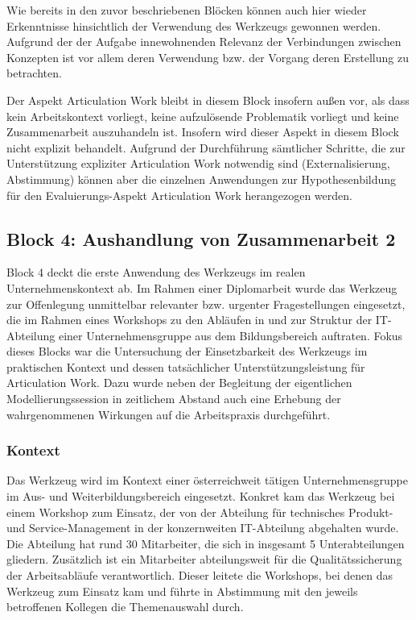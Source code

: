 Wie bereits in den zuvor beschriebenen Blöcken können auch hier wieder Erkenntnisse hinsichtlich der Verwendung des Werkzeugs gewonnen werden. Aufgrund der der Aufgabe innewohnenden Relevanz der Verbindungen zwischen Konzepten ist vor allem deren Verwendung bzw. der Vorgang deren Erstellung zu betrachten.

Der Aspekt Articulation Work bleibt in diesem Block insofern außen vor, als dass kein Arbeitskontext vorliegt, keine aufzulösende Problematik vorliegt und keine Zusammenarbeit auszuhandeln ist. Insofern wird dieser Aspekt in diesem Block nicht explizit behandelt. Aufgrund der Durchführung sämtlicher Schritte, die zur Unterstützung expliziter Articulation Work notwendig sind (Externalisierung, Abstimmung) können aber die einzelnen Anwendungen zur Hypothesenbildung für den Evaluierungs-Aspekt Articulation Work herangezogen werden.


\subsection{Block 4: Aushandlung von Zusammenarbeit 2}
\label{sub:eval_4}

Block 4 deckt die erste Anwendung des Werkzeugs im realen Unternehmenskontext ab. Im Rahmen einer Diplomarbeit \citep{Wahlmuller10} wurde das Werkzeug zur Offenlegung unmittelbar relevanter bzw. urgenter Fragestellungen eingesetzt, die im Rahmen eines Workshops zu den Abläufen in und zur Struktur der IT-Abteilung einer Unternehmensgruppe aus dem Bildungsbereich auftraten. Fokus dieses Blocks war die Untersuchung der Einsetzbarkeit des Werkzeugs im praktischen Kontext und dessen tatsächlicher Unterstützungsleistung für Articulation Work. Dazu wurde neben der Begleitung der eigentlichen Modellierungssession in zeitlichem Abstand auch eine Erhebung der wahrgenommenen Wirkungen auf die Arbeitspraxis durchgeführt.

\subsubsection{Kontext} %
\label{ssub:4_kontext}

Das Werkzeug wird im Kontext einer österreichweit tätigen Unternehmensgruppe im Aus- und Weiterbildungsbereich eingesetzt. Konkret kam das Werkzeug bei einem Workshop zum Einsatz, der von der Abteilung für technisches Produkt- und Service-Management in der konzernweiten IT-Abteilung abgehalten wurde. Die Abteilung hat rund 30 Mitarbeiter, die sich in insgesamt 5 Unterabteilungen gliedern. Zusätzlich ist ein Mitarbeiter abteilungsweit für die Qualitätssicherung der Arbeitsabläufe verantwortlich. Dieser leitete die Workshops, bei denen das Werkzeug zum Einsatz kam und führte in Abstimmung mit den jeweils betroffenen Kollegen die Themenauswahl durch.

